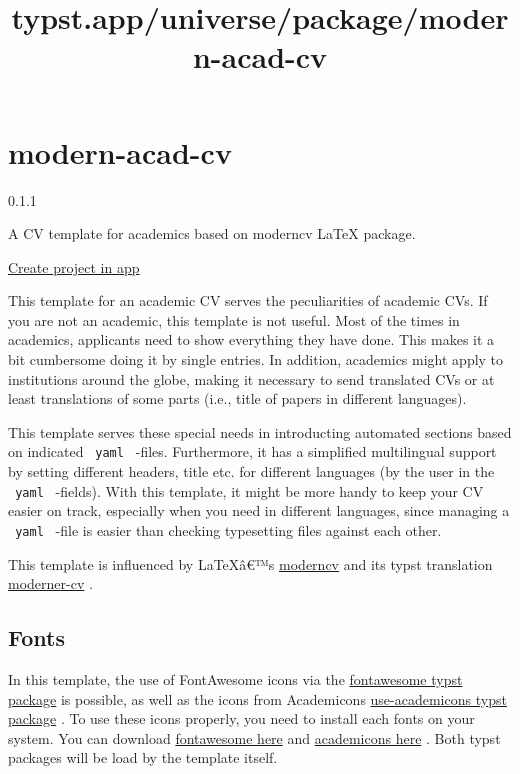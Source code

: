 \title{typst.app/universe/package/modern-acad-cv}

\label{banner}
\label{template-thumbnail}

\section{modern-acad-cv}\label{modern-acad-cv}

{ 0.1.1 }

A CV template for academics based on moderncv LaTeX package.

\href{/app?template=modern-acad-cv&version=0.1.1}{Create project in app}

\label{readme}
This template for an academic CV serves the peculiarities of academic
CVs. If you are not an academic, this template is not useful. Most of
the times in academics, applicants need to show everything they have
done. This makes it a bit cumbersome doing it by single entries. In
addition, academics might apply to institutions around the globe, making
it necessary to send translated CVs or at least translations of some
parts (i.e., title of papers in different languages).

This template serves these special needs in introducting automated
sections based on indicated \texttt{\ yaml\ } -files. Furthermore, it
has a simplified multilingual support by setting different headers,
title etc. for different languages (by the user in the \texttt{\ yaml\ }
-fields). With this template, it might be more handy to keep your CV
easier on track, especially when you need in different languages, since
managing a \texttt{\ yaml\ } -file is easier than checking typesetting
files against each other.

This template is influenced by LaTeXâ€™s
\href{https://github.com/moderncv/moderncv}{moderncv} and its typst
translation
\href{https://github.com/DeveloperPaul123/modern-cv}{moderner-cv} .

\subsection{Fonts}\label{fonts}

In this template, the use of FontAwesome icons via the
\href{https://typst.app/universe/package/fontawesome}{fontawesome typst
package} is possible, as well as the icons from Academicons
\href{https://typst.app/universe/package/use-academicons}{use-academicons
typst package} . To use these icons properly, you need to install each
fonts on your system. You can download
\href{https://fontawesome.com/download}{fontawesome here} and
\href{https://jpswalsh.github.io/academicons/}{academicons here} . Both
typst packages will be load by the template itself.

